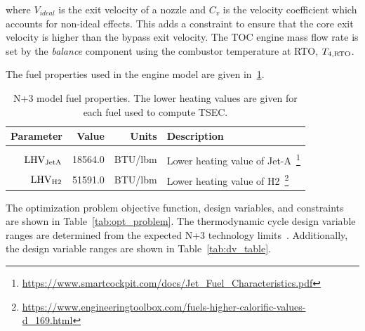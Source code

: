 \documentclass[conf]{new-aiaa}
\begin{document}
\noindent
where $V_{ideal}$ is the exit velocity of a nozzle and $C_v$ is the velocity coefficient which accounts for non-ideal effects.
This adds a constraint to ensure that the core exit velocity is higher than the bypass exit velocity.
The TOC engine mass flow rate is set by the \emph{balance} component using the combustor temperature at RTO, $T_{4,\rm{RTO}}$.

The fuel properties used in the engine model are given in~\ref{fuel_props}.

\begin{table}[hbt!]
    \centering
    \caption{
        N+3 model fuel properties.
        The lower heating values are given for each fuel used to compute TSEC.}
    \begin{tabular}{r r r l}
        \hline
        Parameter              & Value   & Units        & Description                                                                                                            \\
        \hline                                                                                                                                                                   \\
        $\rm{LHV}_{\rm{JetA}}$ & 18564.0 & \si{BTU/lbm} & Lower heating value of Jet-A~\footnote{\url{https://www.smartcockpit.com/docs/Jet_Fuel_Characteristics.pdf}}           \\
        $\rm{LHV}_{\rm{H2}}$   & 51591.0 & \si{BTU/lbm} & Lower heating value of H2~\footnote{\url{https://www.engineeringtoolbox.com/fuels-higher-calorific-values-d_169.html}} \\
        \hline
    \end{tabular}
    \label{fuel_props}
\end{table}

The optimization problem objective function, design variables, and constraints are shown in Table~\ref{tab:opt_problem}.
The thermodynamic cycle design variable ranges are determined from the expected N+3 technology limits~\cite{Hendricks2019}.
Additionally, the design variable ranges are shown in Table~\ref{tab:dv_table}.
\end{document}
